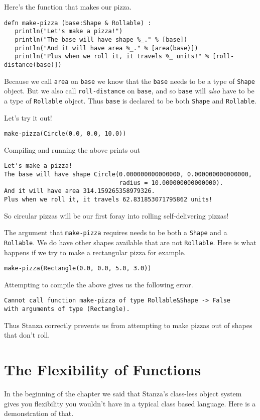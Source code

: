 \documentclass[10pt,oneside]{book}
\begin{document}
Here's the function that makes our pizza.
\begin{lstlisting}
defn make-pizza (base:Shape & Rollable) :
   println("Let's make a pizza!")
   println("The base will have shape %_." % [base])
   println("And it will have area %_." % [area(base)])
   println("Plus when we roll it, it travels %_ units!" % [roll-distance(base)])
\end{lstlisting}
Because we call \texttt{\frenchspacing area} on \texttt{\frenchspacing base} we know that the \texttt{\frenchspacing base} needs to be a type of \texttt{\frenchspacing Shape} object. But we also call \texttt{\frenchspacing roll-distance} on \texttt{\frenchspacing base}, and so \texttt{\frenchspacing base} will {\em also} have to be a type of \texttt{\frenchspacing Rollable} object. Thus \texttt{\frenchspacing base} is declared to be both \texttt{\frenchspacing Shape} and \texttt{\frenchspacing Rollable}.

Let's try it out!
\begin{lstlisting}
make-pizza(Circle(0.0, 0.0, 10.0))
\end{lstlisting}
Compiling and running the above prints out
\begin{lstlisting}
Let's make a pizza!
The base will have shape Circle(0.000000000000000, 0.000000000000000, 
                                radius = 10.000000000000000).
And it will have area 314.159265358979326.
Plus when we roll it, it travels 62.831853071795862 units!
\end{lstlisting}
So circular pizzas will be our first foray into rolling self-delivering pizzas!

The argument that \texttt{\frenchspacing make-pizza} requires needs to be both a \texttt{\frenchspacing Shape} and a \texttt{\frenchspacing Rollable}. We do have other shapes available that are not \texttt{\frenchspacing Rollable}. Here is what happens if we try to make a rectangular pizza for example.
\begin{lstlisting}
make-pizza(Rectangle(0.0, 0.0, 5.0, 3.0))
\end{lstlisting}
Attempting to compile the above gives us the following error.
\begin{lstlisting}
Cannot call function make-pizza of type Rollable&Shape -> False 
with arguments of type (Rectangle).
\end{lstlisting}
Thus Stanza correctly prevents us from attempting to make pizzas out of shapes that don't roll.

\section{The Flexibility of Functions}
In the beginning of the chapter we said that Stanza's class-less object system gives you flexibility you wouldn't have in a typical class based language. Here is a demonstration of that. 
\end{document}
